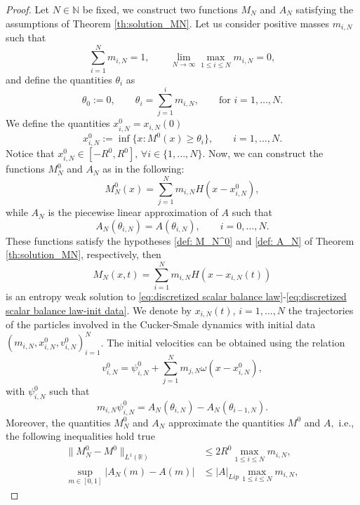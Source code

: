 \documentclass[11pt,a4paper,oneside]{amsart}
\newcommand\R{\mathbb{R}}
\newcommand\N{\mathbb{N}}
\begin{document}
    \begin{proof}
        Let $N\in\N$ be fixed, we construct two functions $M_N$ and $A_N$ %
        satisfying the assumptions of Theorem \ref{th:solution_MN}. 
        Let us consider positive masses $m_{i,N}$ such that 
        \begin{equation}\label{def:hypotheses_m_iN}
            \sum_{i=1}^N m_{i,N}=1,\qquad \lim_{N\to\infty}\max_{1\leq i\leq N} m_{i,N}=0,
        \end{equation}
         and define the quantities $\theta_i$ as
        $$
        \theta_0:=0,\qquad \theta_i=\sum_{j=1}^i m_{i,N},\qquad \text{for $i=1,\dots,N$}.
        $$
        We define the quantities $x_{i,N}^0=x_{i,N}(0)$
        $$
        x_{i,N}^0:=\inf\{x: M^0(x)\geq\theta_i\},\qquad i=1,\dots,N.
        $$
       Notice that $x_{i,N}^0 \in [-R^0,R^0],\, \forall i\in\{1,...,N\}$. %
       Now, we can construct the functions $M_N^0$ and $A_N$ as in the following:
        $$
        M_N^0(x)=\sum_{j=1}^N m_{i,N}H(x-x_{i,N}^0),
        $$
        while $A_N$ is the piecewise linear approximation of $A$ such that
        \begin{equation}\label{def:A_N-theta}
            A_N(\theta_{i,N})=A(\theta_{i,N}),\qquad i=0,\dots,N.
        \end{equation}
        These functions satisfy the hypotheses \eqref{def: M_N^0} and \eqref{def: A_N} of Theorem \ref{th:solution_MN}, respectively, then
        $$
        M_N(x,t)=\sum_{i=1}^N m_{i,N}H(x-x_{i,N}(t))
        $$
        is an entropy weak solution to \eqref{eq:discretized scalar balance law}-\eqref{eq:discretized scalar balance law-init data}. We denote by $x_{i,N}(t)$, $i=1,\dots,N$ the trajectories of the particles involved in the Cucker-Smale dynamics 
        with initial data $(m_{i,N},x_{i,N}^0,v_{i,N}^0)_{i=1}^N$. %
        The initial velocities can be obtained using the relation 
        $$
        v_{i,N}^0=\psi_{i,N}^0+\sum_{j=1}^N m_{j,N}\omega(x-x_{i,N}^0),
        $$
        with $\psi_{i,N}^0$ such that 
        $$
        m_{i,N}\psi_{i,N}^0=A_N(\theta_{i,N})-A_N(\theta_{i-1,N}).
        $$
        Moreover, the quantities $M_N^0$ and $A_N$ approximate the quantities $M^0$ and $A,$ i.e., the following inequalities hold true
        \begin{align}
            \|M_N^0-M^0\|_{L^1(\R)}&\leq 2R^0\max_{1\leq i\leq N}m_{i,N},
            \label{eq:convergence-M^0}
            \\ \sup_{m\in[0,1]}|A_N(m)-A(m)|&\leq |A|_{Lip}\max_{1\leq i\leq N}m_{i,N},

\end{align}
\end{proof}
\end{document}
